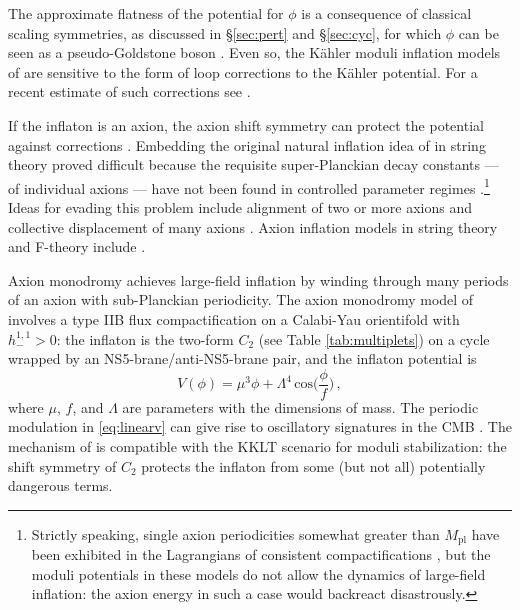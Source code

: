 \documentclass[12pt,a4wide]{article}
\begin{document}
The approximate flatness of the potential for $\phi$ is a consequence of classical scaling symmetries, as discussed in \S\ref{sec:pert} and \S\ref{sec:cyc}, 
for which $\phi$ can be seen as a pseudo-Goldstone boson \cite{Burgess:2014tja, Burgess:2016owb}.  Even so, the K\"ahler moduli inflation models of 
\cite{Conlon:2005jm,Cicoli:2008gp} 
are sensitive to the form of loop corrections to the K\"ahler potential. For a recent estimate of such corrections see \cite{Cicoli:2023njy}.

If the inflaton is an axion, the axion shift symmetry can protect the potential against corrections \cite{Freese:1990rb}.  
Embedding the original natural inflation idea of \cite{Freese:1990rb} in string theory proved difficult because the requisite super-Planckian decay constants --- of individual axions --- have not been found in controlled parameter regimes
\cite{Banks:2003sx,Arkani-Hamed:2006emk}.\footnote{Strictly speaking, single axion periodicities somewhat greater than $M_{\text{pl}}$ have been exhibited in the Lagrangians of consistent compactifications \cite{Bachlechner:2014gfa,Conlon:2016aea}, but the moduli potentials in these models do not allow the dynamics of large-field inflation: the axion energy in such a case would backreact disastrously.}
Ideas for evading this problem include
alignment of two or more axions \cite{Kim:2004rp} and
collective displacement of many axions \cite{Dimopoulos:2005ac,Easther:2005zr}.
Axion inflation models in string theory and F-theory include \cite{Grimm:2007hs,Grimm:2014vva}.

Axion monodromy \cite{Silverstein:2008sg} achieves large-field inflation by winding through many periods of an axion with sub-Planckian periodicity.
The axion monodromy model of \cite{McAllister:2008hb} involves a type IIB flux compactification on a Calabi-Yau orientifold with $h^{1,1}_{-}>0$: the inflaton is the two-form $C_2$ (see Table \ref{tab:multiplets}) on a cycle wrapped by an NS5-brane/anti-NS5-brane pair, and the inflaton potential is \cite{McAllister:2008hb,Flauger:2009ab}
\begin{equation}\label{eq:linearv}
    V(\phi) = \mu^3 \phi + \Lambda^4\,\text{cos}\biggl(\frac{\phi}{f}\biggr)\,,
\end{equation} where $\mu$, $f$, and $\Lambda$ are parameters with the dimensions of mass.  The periodic modulation in \eqref{eq:linearv} can give rise to oscillatory signatures in the CMB \cite{Flauger:2009ab}.
The mechanism of \cite{McAllister:2008hb} is compatible with the KKLT scenario for moduli stabilization: the shift symmetry of $C_2$ protects the inflaton from some (but not all) potentially dangerous terms.
\end{document}

